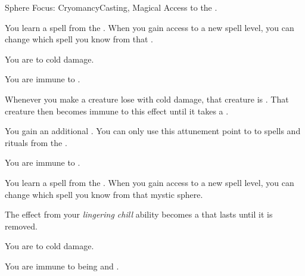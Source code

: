     \begin{feat}{Sphere Focus: Cryomancy}{Casting, Magical}
        \featpre Access to the  .

         You learn a spell from the  .
        When you gain access to a new spell level, you can change which spell you know from that .

         You are  to cold damage.

         You are immune to .

         Whenever you make a creature lose  with cold damage, that creature is  \slowed.
        That creature then becomes immune to this effect until it takes a .

         You gain an additional .
        You can only use this attunement point to  to spells and rituals from the  .

         You are immune to .

         You learn a spell from the  .
        When you gain access to a new spell level, you can change which spell you know from that mystic sphere.

         The \slowed effect from your \textit{lingering chill} ability becomes a  that lasts until it is removed.

         You are  to cold damage.

         You are immune to being  and .
    \end{feat}

